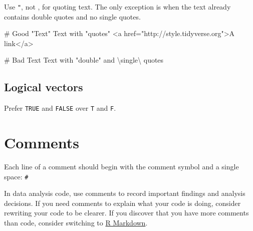\documentclass[twoside, pagesize, fontsize=11pt, dvipsnames]{scrreport} %
\newenvironment{Shaded}{\begin{snugshade}}{\end{snugshade}}
\newcommand{\CommentTok}[1]{\textcolor[rgb]{0.37,0.37,0.37}{#1}}
\newcommand{\SpecialCharTok}[1]{\textcolor[rgb]{0.37,0.37,0.37}{#1}}
\newcommand{\StringTok}[1]{\textcolor[rgb]{0.13,0.47,0.30}{#1}}
\begin{document}
Use \texttt{"}, not \texttt{\textquotesingle{}}, for quoting text. The
only exception is when the text already contains double quotes and no
single quotes.

\begin{Shaded}
\begin{Highlighting}[]
\CommentTok{\# Good}
\StringTok{"Text"}
\StringTok{\textquotesingle{}Text with "quotes"\textquotesingle{}}
\StringTok{\textquotesingle{}\textless{}a href="http://style.tidyverse.org"\textgreater{}A link\textless{}/a\textgreater{}\textquotesingle{}}

\CommentTok{\# Bad}
\StringTok{\textquotesingle{}Text\textquotesingle{}}
\StringTok{\textquotesingle{}Text with "double" and }\SpecialCharTok{\textbackslash{}\textquotesingle{}}\StringTok{single}\SpecialCharTok{\textbackslash{}\textquotesingle{}}\StringTok{ quotes\textquotesingle{}}
\end{Highlighting}
\end{Shaded}

\hypertarget{logical-vectors}{%
\subsection{Logical vectors}\label{logical-vectors}}

Prefer \texttt{TRUE} and \texttt{FALSE} over \texttt{T} and \texttt{F}.

\hypertarget{comments}{%
\section{Comments}\label{comments}}

Each line of a comment should begin with the comment symbol and a single
space: \texttt{\#}

In data analysis code, use comments to record important findings and
analysis decisions. If you need comments to explain what your code is
doing, consider rewriting your code to be clearer. If you discover that
you have more comments than code, consider switching to
\href{https://rmarkdown.rstudio.com/}{R Markdown}.



\end{document}
